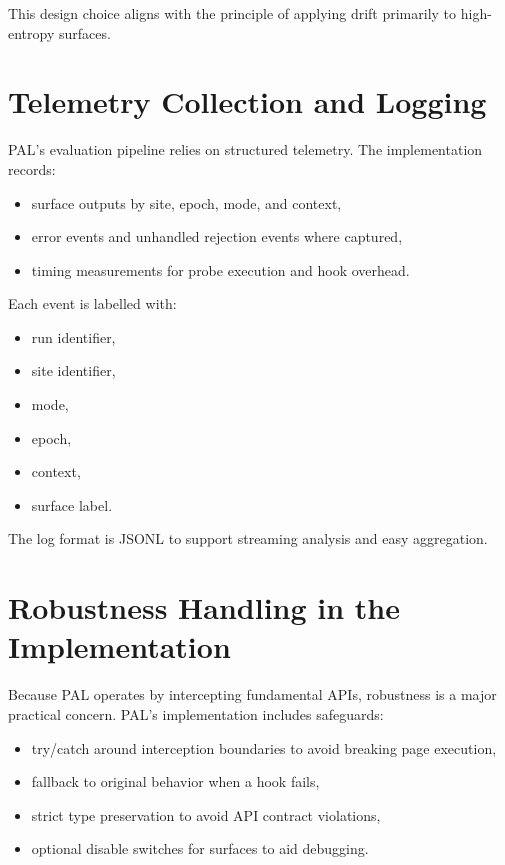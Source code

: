 \documentclass[11pt]{report}
\begin{document}
This design choice aligns with the principle of applying drift primarily to high-entropy surfaces.

\section{Telemetry Collection and Logging}

PAL’s evaluation pipeline relies on structured telemetry. The implementation records:

\begin{itemize}
    \item surface outputs by site, epoch, mode, and context,
    \item error events and unhandled rejection events where captured,
    \item timing measurements for probe execution and hook overhead.
\end{itemize}

Each event is labelled with:
\begin{itemize}
    \item run identifier,
    \item site identifier,
    \item mode,
    \item epoch,
    \item context,
    \item surface label.
\end{itemize}

The log format is JSONL to support streaming analysis and easy aggregation.

\section{Robustness Handling in the Implementation}

Because PAL operates by intercepting fundamental APIs, robustness is a major practical concern. PAL’s implementation includes safeguards:

\begin{itemize}
    \item try/catch around interception boundaries to avoid breaking page execution,
    \item fallback to original behavior when a hook fails,
    \item strict type preservation to avoid API contract violations,
    \item optional disable switches for surfaces to aid debugging.
\end{itemize}
\end{document}

